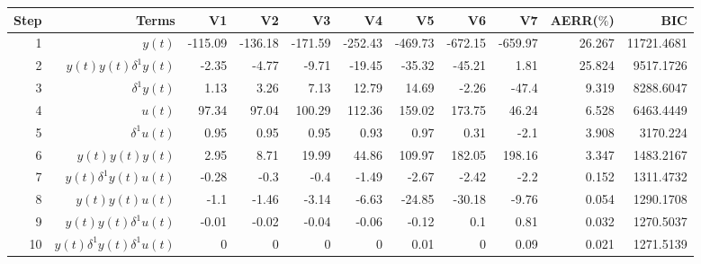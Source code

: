 \begin{tabular}{rrrrrrrrrrr}
Step & Terms & V1 & V2 & V3 & V4 & V5 & V6 & V7 & AERR($\%$) & BIC \\ 
\hline 
1 & $y(t)$ & -115.09 & -136.18 & -171.59 & -252.43 & -469.73 & -672.15 & -659.97 & 26.267 & 11721.4681 \\ 
2 & $y(t)y(t)\delta^1 y(t)$ & -2.35 & -4.77 & -9.71 & -19.45 & -35.32 & -45.21 & 1.81 & 25.824 & 9517.1726 \\ 
3 & $\delta^1 y(t)$ & 1.13 & 3.26 & 7.13 & 12.79 & 14.69 & -2.26 & -47.4 & 9.319 & 8288.6047 \\ 
4 & $u(t)$ & 97.34 & 97.04 & 100.29 & 112.36 & 159.02 & 173.75 & 46.24 & 6.528 & 6463.4449 \\ 
5 & $\delta^1 u(t)$ & 0.95 & 0.95 & 0.95 & 0.93 & 0.97 & 0.31 & -2.1 & 3.908 & 3170.224 \\ 
6 & $y(t)y(t)y(t)$ & 2.95 & 8.71 & 19.99 & 44.86 & 109.97 & 182.05 & 198.16 & 3.347 & 1483.2167 \\ 
7 & $y(t)\delta^1 y(t)u(t)$ & -0.28 & -0.3 & -0.4 & -1.49 & -2.67 & -2.42 & -2.2 & 0.152 & 1311.4732 \\ 
8 & $y(t)y(t)u(t)$ & -1.1 & -1.46 & -3.14 & -6.63 & -24.85 & -30.18 & -9.76 & 0.054 & 1290.1708 \\ 
9 & $y(t)y(t)\delta^1 u(t)$ & -0.01 & -0.02 & -0.04 & -0.06 & -0.12 & 0.1 & 0.81 & 0.032 & 1270.5037 \\ 
10 & $y(t)\delta^1 y(t)\delta^1 u(t)$ & 0 & 0 & 0 & 0 & 0.01 & 0 & 0.09 & 0.021 & 1271.5139 \\ 
\hline 
\end{tabular}